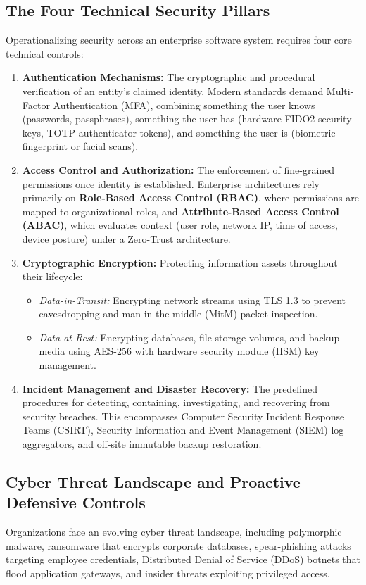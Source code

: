 \documentclass[11pt,a4paper]{article}
\begin{document}
\subsection{The Four Technical Security Pillars}
Operationalizing security across an enterprise software system requires four core technical controls:
\begin{enumerate}
    \item \textbf{Authentication Mechanisms:} The cryptographic and procedural verification of an entity's claimed identity. Modern standards demand Multi-Factor Authentication (MFA), combining something the user knows (passwords, passphrases), something the user has (hardware FIDO2 security keys, TOTP authenticator tokens), and something the user is (biometric fingerprint or facial scans).
    \item \textbf{Access Control and Authorization:} The enforcement of fine-grained permissions once identity is established. Enterprise architectures rely primarily on \textbf{Role-Based Access Control (RBAC)}, where permissions are mapped to organizational roles, and \textbf{Attribute-Based Access Control (ABAC)}, which evaluates context (user role, network IP, time of access, device posture) under a Zero-Trust architecture.
    \item \textbf{Cryptographic Encryption:} Protecting information assets throughout their lifecycle:
    \begin{itemize}
        \item \textit{Data-in-Transit:} Encrypting network streams using TLS 1.3 to prevent eavesdropping and man-in-the-middle (MitM) packet inspection.
        \item \textit{Data-at-Rest:} Encrypting databases, file storage volumes, and backup media using AES-256 with hardware security module (HSM) key management.
    \end{itemize}
    \item \textbf{Incident Management and Disaster Recovery:} The predefined procedures for detecting, containing, investigating, and recovering from security breaches. This encompasses Computer Security Incident Response Teams (CSIRT), Security Information and Event Management (SIEM) log aggregators, and off-site immutable backup restoration.
\end{enumerate}

\subsection{Cyber Threat Landscape and Proactive Defensive Controls}
Organizations face an evolving cyber threat landscape, including polymorphic malware, ransomware that encrypts corporate databases, spear-phishing attacks targeting employee credentials, Distributed Denial of Service (DDoS) botnets that flood application gateways, and insider threats exploiting privileged access.
\end{document}
